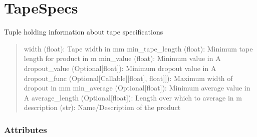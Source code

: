\documentclass[letterpaper,10pt,english]{sphinxmanual}
\begin{document}
\section{TapeSpecs}
\label{\detokenize{generated/quality_assessment.data_types.TapeSpecs:tapespecs}}\label{\detokenize{generated/quality_assessment.data_types.TapeSpecs::doc}}

\begin{fulllineitems}
\label{\detokenize{generated/quality_assessment.data_types.TapeSpecs:quality_assessment.data_types.TapeSpecs}}
\sphinxAtStartPar
Tuple holding information about tape specifications
\begin{quote}

\sphinxAtStartPar
width (float): Tape width in mm
min\_tape\_length (float): Minimum tape length for product in m
min\_value (float): Minimum value in A
dropout\_value (Optional{[}float{]}): Minimum drop\sphinxhyphen{}out value in A
dropout\_func (Optional{[}Callable{[}{[}float{]}, float{]}{]}): Maximum width of drop\sphinxhyphen{}out in mm
min\_average (Optional{[}float{]}): Minimum average value in A
average\_length (Optional{[}float{]}): Length over which to average in m
description (str): Name/Description of the product
\end{quote}
\subsubsection*{Attributes}



\end{fulllineitems}
\end{document}
